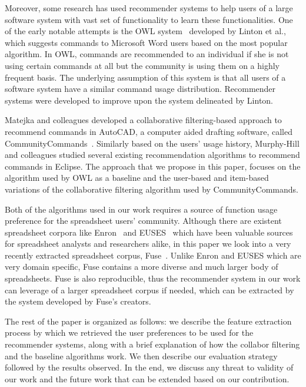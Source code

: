 \documentclass{article} %
\begin{document}
Moreover, some research has used recommender systems to help users of a large software system with vast set of functionality to learn these functionalities. One of the early notable attempts is the OWL system~\cite{linton2000owl} developed by Linton et al., which suggests commands to Microsoft Word users based on the most popular algorithm. In OWL, commands are recommended to an individual if she is not using certain commands at all but the community is using them on a highly frequent basis. The underlying assumption of this system is that all users of a software system have a similar command usage distribution. Recommender systems were developed to improve upon the system delineated by Linton.

Matejka and colleagues developed a collaborative filtering-based approach to recommend commands in AutoCAD, a computer aided drafting software, called CommunityCommands~\cite{matejka2009communitycommands}. Similarly based on the users' usage history, Murphy-Hill and colleagues studied several existing recommendation algorithms to recommend commands in Eclipse. The approach that we propose in this paper,  focuses on the algorithm used by OWL as a baseline and the user-based and item-based variations of the collaborative filtering algorithm used by CommunityCommands.

Both of the algorithms used in our work requires a source of function usage preference for the spreadsheet users' community. Although there are existent spreadsheet corpora like Enron~\cite{hermans2014enron} and EUSES~\cite{fisher2005euses} which have been valuable sources for spreadsheet analysts and researchers alike, in this paper we look into a very recently extracted spreadsheet corpus, Fuse~\cite{barik2015fuse}. Unlike Enron and EUSES which are very domain specific, Fuse contains a more diverse and much larger body of spreadsheets. Fuse is also reproducible, thus the recommender system in our work can leverage of a larger spreadsheet corpus if needed, which can be extracted by the system developed by Fuse's creators.

The rest of the paper is organized as follows: we describe the feature extraction process by which we retrieved the user preferences to be used for the recommender systems, along with a brief explanation of how the collabor filtering and the baseline algorithms work. We then describe our evaluation strategy followed by the results observed. In the end, we discuss any threat to validity of our work and the future work that can be extended based on our contribution.
\end{document}
